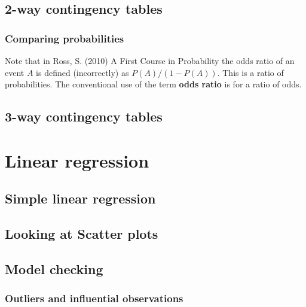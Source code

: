 \documentclass[
  british,
]{book}
\begin{document}
\hypertarget{way2}{%
\section{2-way contingency tables}\label{way2}}

\hypertarget{comparing-probabilities}{%
\subsection{Comparing probabilities}\label{comparing-probabilities}}

Note that in Ross, S. (2010) A First Course in Probability the odds ratio of an event \(A\) is defined (incorrectly) as \(P(A) / (1 - P(A))\). This is a ratio of probabilities. The conventional use of the term \textbf{odds ratio} is for a ratio of odds.

\hypertarget{way3}{%
\section{3-way contingency tables}\label{way3}}

\hypertarget{linreg}{%
\chapter{Linear regression}\label{linreg}}

\hypertarget{simple-linear-regression}{%
\section{Simple linear regression}\label{simple-linear-regression}}

\hypertarget{looking-at-scatter-plots}{%
\section{Looking at Scatter plots}\label{looking-at-scatter-plots}}

\hypertarget{model-checking}{%
\section{Model checking}\label{model-checking}}

\hypertarget{outliers}{%
\subsection{Outliers and influential observations}\label{outliers}}
\end{document}
